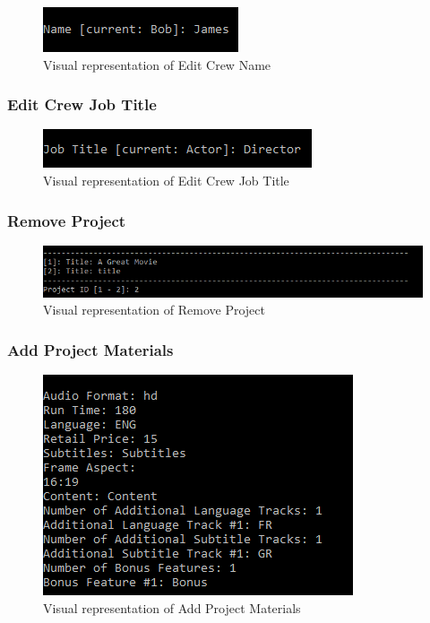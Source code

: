 \documentclass[
  english,
  a4paper,
,tablecaptionabove
]{scrartcl}
\begin{document}
\begin{figure}
\centering
\includegraphics{images/ui-screenshots/update-crew-name.png}
\caption{Visual representation of Edit Crew Name}
\end{figure}

\newpage

\hypertarget{edit-crew-job-title}{%
\subsubsection{Edit Crew Job Title}\label{edit-crew-job-title}}

\begin{figure}
\centering
\includegraphics{images/ui-screenshots/update-crew-job-title.png}
\caption{Visual representation of Edit Crew Job Title}
\end{figure}

\newpage

\hypertarget{remove-project}{%
\subsubsection{Remove Project}\label{remove-project}}

\begin{figure}
\centering
\includegraphics{images/ui-screenshots/remove-project.png}
\caption{Visual representation of Remove Project}
\end{figure}

\newpage

\hypertarget{add-project-materials}{%
\subsubsection{Add Project Materials}\label{add-project-materials}}

\begin{figure}
\centering
\includegraphics{images/ui-screenshots/add-project-materials.png}
\caption{Visual representation of Add Project Materials}
\end{figure}
\end{document}
